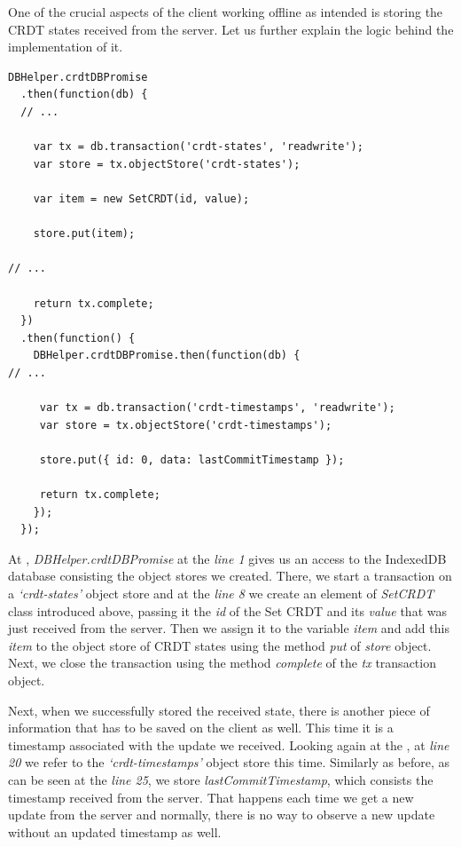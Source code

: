 One of the crucial aspects of the client working offline as intended is storing the CRDT states received from the server. Let us further explain the logic behind the implementation of it.

\begin{lstlisting}[caption={[Caching on a client side CRDT states, received from the server]Storing CRDT states in the local database after a successful request from the server.}, label={lst:dev9}]
DBHelper.crdtDBPromise
  .then(function(db) {
  // ...

    var tx = db.transaction('crdt-states', 'readwrite');
    var store = tx.objectStore('crdt-states');

    var item = new SetCRDT(id, value);

    store.put(item);

// ...

    return tx.complete;
  })
  .then(function() {
    DBHelper.crdtDBPromise.then(function(db) {
// ...

     var tx = db.transaction('crdt-timestamps', 'readwrite');
     var store = tx.objectStore('crdt-timestamps');
     
     store.put({ id: 0, data: lastCommitTimestamp });

     return tx.complete;
    });
  });
\end{lstlisting}

At , \textit{DBHelper.crdtDBPromise} at the \textit{line 1} gives us an access to the IndexedDB database consisting the object stores we created. There, we start a transaction on a \textit{`crdt-states'} object store and at the \textit{line 8} we create an element of \textit{SetCRDT} class introduced above, passing it the \textit{id} of the Set CRDT and its \textit{value} that was just received from the server. Then we assign it to the variable \textit{item} and add this \textit{item} to the object store of CRDT states using the method \textit{put} of \textit{store} object. Next, we close the transaction using the method \textit{complete} of the \textit{tx} transaction object.

Next, when we successfully stored the received state, there is another piece of information that has to be saved on the client as well. This time it is a timestamp associated with the update we received. Looking again at the , at \textit{line 20} we refer to the \textit{`crdt-timestamps'} object store this time. Similarly as before, as can be seen at the \textit{line 25}, we store \textit{lastCommitTimestamp}, which consists the timestamp received from the server. That happens each time we get a new update from the server and normally, there is no way to observe a new update without an updated timestamp as well.


